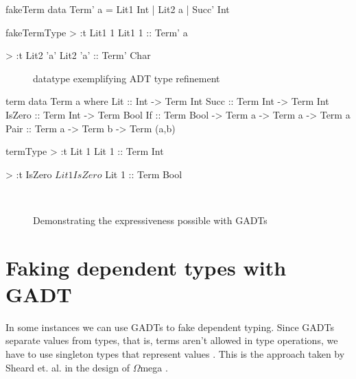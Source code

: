 \begin{SaveVerbatim}{fakeTerm}
data Term' a = Lit1 Int
             | Lit2 a
             | Succ' Int

\end{SaveVerbatim}

\begin{SaveVerbatim}{fakeTermType}
> :t Lit1 1
Lit1 1 :: Term' a

> :t Lit2 'a'
Lit2 'a' :: Term' Char
\end{SaveVerbatim}

\begin{figure}
  \begin{subfigure}[b]{.5\linewidth}
    \caption{}
  \end{subfigure}
  \begin{subfigure}[b]{.5\linewidth}
    \caption{}
  \end{subfigure}
  \caption{datatype exemplifying ADT type refinement}
  \label{fig:fakeTerm}
\end{figure}


\begin{SaveVerbatim}{term}
data Term a where
  Lit    :: Int -> Term Int
  Succ   :: Term Int -> Term Int
  IsZero :: Term Int -> Term Bool
  If     :: Term Bool -> Term a -> Term a -> Term a
  Pair   :: Term a -> Term b -> Term (a,b)
\end{SaveVerbatim}

\begin{SaveVerbatim}{termType}
> :t Lit 1
Lit 1 :: Term Int

> :t IsZero $ Lit 1
IsZero $ Lit 1 :: Term Bool
\end{SaveVerbatim}


\begin{figure}
  \centering
  \begin{subfigure}{.5\linewidth}
    \caption{}
  \end{subfigure}
  \\
  \begin{subfigure}{.5\linewidth}
    \caption{}
  \end{subfigure}
  \caption{Demonstrating the expressiveness possible with GADTs}
  \label{fig:term}
\end{figure}

\section{Faking dependent types with GADT}
In some instances we can use GADTs to fake dependent typing. Since GADTs separate values from types, that is, terms aren't allowed in type operations, we have to use singleton types that represent values \cite{gadts}. This is the approach taken by Sheard et. al. in the design of $\Omega$mega \cite{gadts}.


